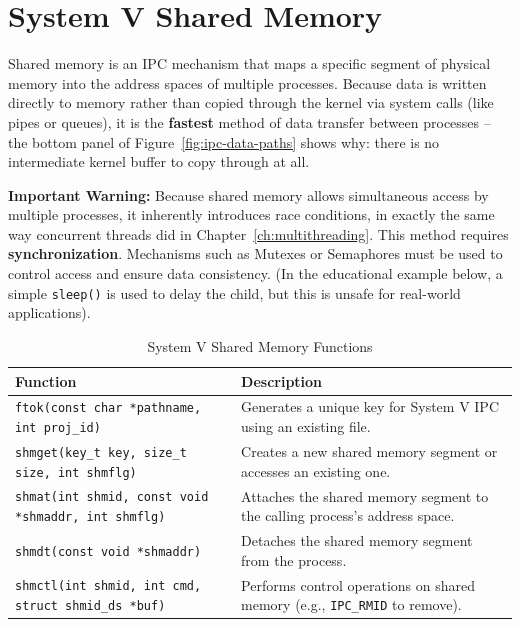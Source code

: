 \section{System V Shared Memory}
Shared memory is an IPC mechanism that maps a specific segment of physical memory into the address spaces of multiple processes. Because data is written directly to memory rather than copied through the kernel via system calls (like pipes or queues), it is the \textbf{fastest} method of data transfer between processes -- the bottom panel of Figure~\ref{fig:ipc-data-paths} shows why: there is no intermediate kernel buffer to copy through at all.

\textbf{Important Warning:} Because shared memory allows simultaneous access by multiple processes, it inherently introduces race conditions, in exactly the same way concurrent threads did in Chapter~\ref{ch:multithreading}. This method requires \textbf{synchronization}. Mechanisms such as Mutexes or Semaphores must be used to control access and ensure data consistency. (In the educational example below, a simple \texttt{sleep()} is used to delay the child, but this is unsafe for real-world applications).

\begin{table}[h!]
\centering
\small
\renewcommand{\arraystretch}{1.4}
\begin{tabular}{|p{6.5cm}|p{7.5cm}|}
\hline
\textbf{Function} & \textbf{Description} \\ \hline
\texttt{ftok(const char *pathname, int proj\_id)} & Generates a unique key for System V IPC using an existing file. \\ \hline
\texttt{shmget(key\_t key, size\_t size, int shmflg)} & Creates a new shared memory segment or accesses an existing one. \\ \hline
\texttt{shmat(int shmid, const void *shmaddr, int shmflg)} & Attaches the shared memory segment to the calling process's address space. \\ \hline
\texttt{shmdt(const void *shmaddr)} & Detaches the shared memory segment from the process. \\ \hline
\texttt{shmctl(int shmid, int cmd, struct shmid\_ds *buf)} & Performs control operations on shared memory (e.g., \texttt{IPC\_RMID} to remove). \\ \hline
\end{tabular}
\caption{System V Shared Memory Functions}
\end{table}

